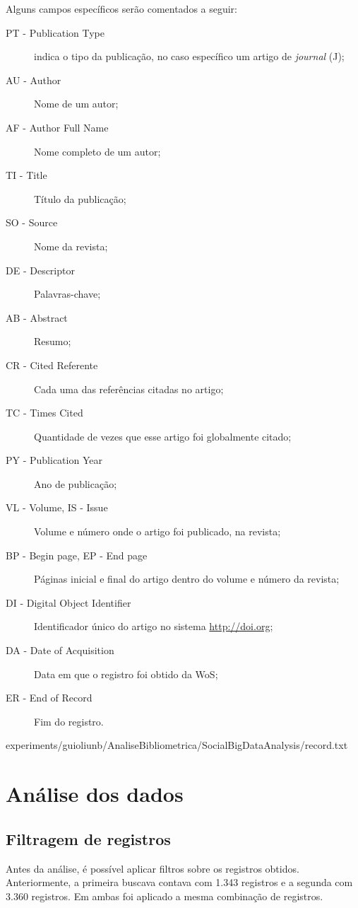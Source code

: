 Alguns campos específicos serão comentados a seguir:
\begin{description}
    \item [PT - Publication Type] indica o tipo da publicação, no caso específico um artigo de \textit{journal} (J);
    \item [AU - Author] Nome de um autor;
    \item [AF - Author Full Name] Nome completo de um autor;
    \item [TI - Title] Título da publicação;
    \item [SO - Source] Nome da revista;
    \item [DE - Descriptor] Palavras-chave;
    \item [AB - Abstract] Resumo;
    \item [CR - Cited Referente] Cada uma das referências citadas no artigo;
    \item [TC - Times Cited] Quantidade de vezes que esse artigo foi globalmente citado;
    \item [PY - Publication Year] Ano de publicação;
    \item [VL - Volume, IS - Issue] Volume e número onde o artigo foi publicado, na revista;
    \item [BP - Begin page, EP - End page] Páginas inicial e final do artigo dentro do volume e número da revista;
    \item [DI - Digital Object Identifier] Identificador único do artigo no sistema \url{http://doi.org};
    \item [DA - Date of Acquisition] Data em que o registro foi obtido da WoS;
    \item [ER - End of Record] Fim do registro.
\end{description}


{experiments/guioliunb/AnaliseBibliometrica/SocialBigDataAnalysis/record.txt}

\section{Análise dos dados}

\subsection{Filtragem de registros}
Antes da análise, é possível aplicar filtros sobre os registros obtidos. Anteriormente, a primeira buscava contava com 1.343 registros e a segunda com 3.360 registros. Em ambas foi aplicado a mesma combinação de registros.

